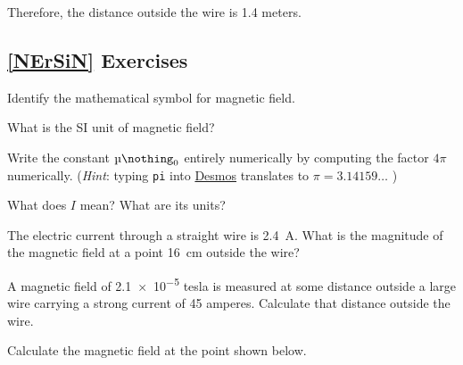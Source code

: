 \documentclass{article}
\numberwithin{equation}{section}
\numberwithin{figure}{section}
\begin{document}
Therefore, the distance outside the wire is 1.4 meters.

\vspace{1em}

\cyanhrule

\clearpage

\subsection*{\ref{NErSiN} Exercises}

\begin{exercise}
    Identify the mathematical symbol for magnetic field.
\end{exercise}

\begin{exercise}
    What is the SI unit of magnetic field?
\end{exercise}


\begin{exercise}
    Write the constant $\mymu_0$ entirely numerically by computing the factor $4\pi$ numerically. (\textit{Hint}: typing \texttt{pi} into \href{https://www.desmos.com/scientific}{Desmos} translates to $\pi = 3.14159\ldots$ )
\end{exercise}

\begin{exercise}
    What does $I$ mean? What are its units?
\end{exercise}

\begin{exercise} \label{eibN4h}
    The electric current through a straight wire is \SI{2.4}{A}. What is the magnitude of the magnetic field at a point \SI{16}{cm} outside the wire?
\end{exercise}

\begin{exercise} \label{Z3KU8j}
    A magnetic field of \num{2.1e-5} tesla is measured at some distance outside a large wire carrying a strong current of 45 amperes. Calculate that distance outside the wire.
\end{exercise}

\begin{exercise} \label{toCeii}
    Calculate the magnetic field at the point shown below.

\begin{center}
\end{center}
\end{exercise}
\end{document}
